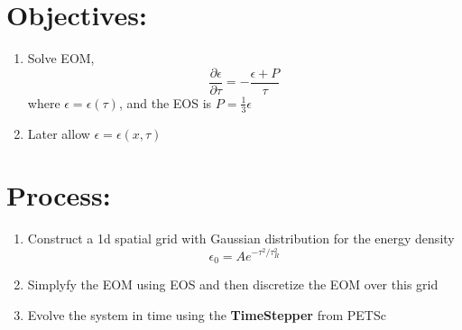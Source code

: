 \documentclass[12pt,preprint,nofootinbib,noshowkeys,noshowpacs,longbibliography,
superscriptaddress,tightenlines,floatfix]{revtex4-2}
\begin{document}
\section{Objectives:}
\begin{enumerate}
    \item Solve EOM, $$\frac{\partial \epsilon}{\partial \tau} = -\frac{\epsilon+P}{\tau}$$
    where $\epsilon = \epsilon(\tau)$, and the EOS is $P = \frac{1}{3}\epsilon$
    \item Later allow $\epsilon = \epsilon(x, \tau)$
\end{enumerate}

\section{Process:}
\begin{enumerate}
    \item Construct a 1d spatial grid with Gaussian distribution for the energy density $$\epsilon_{0} = A e^{-\tau^{2}/\tau^{2}_{R}}$$
    \item Simplyfy the EOM using EOS and then discretize the EOM over this grid 
    \item Evolve the system in time using the \textbf{TimeStepper} from PETSc
\end{enumerate}
\end{document}
